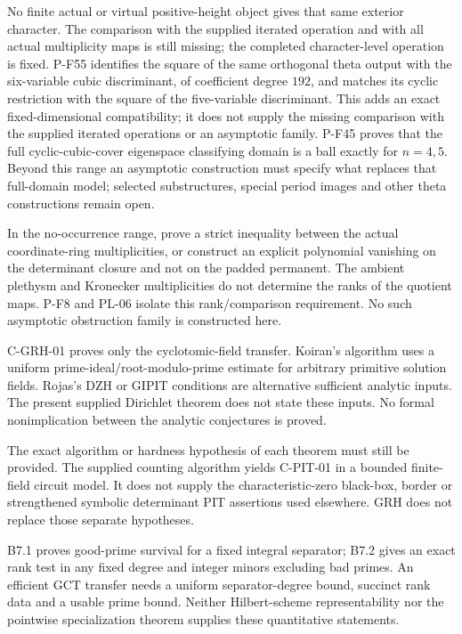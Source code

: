 \documentclass[11pt,a4paper]{article}
\begin{document}
\begin{description}
No finite actual or virtual positive-height object gives that
same exterior character. The comparison with the supplied
iterated operation and with all actual multiplicity maps is
still missing; the completed character-level operation is fixed.
P-F55 identifies the square of the same orthogonal theta output
with the six-variable cubic discriminant, of coefficient degree
$192$, and matches its cyclic restriction with the square of
the five-variable discriminant. This adds an exact fixed-dimensional
compatibility; it does not supply the missing comparison with
the supplied iterated operations or an asymptotic family.
P-F45 proves that the full cyclic-cubic-cover eigenspace
classifying domain is a ball exactly for $n=4,5$. Beyond
this range an asymptotic construction must specify what
replaces that full-domain model; selected substructures,
special period images and other theta constructions remain open.

\item[O-OBSTRUCTION: an actual family of separating equations.]
In the no-occurrence range, prove a strict inequality between the actual
coordinate-ring multiplicities, or construct an explicit polynomial
vanishing on the determinant closure and not on the padded permanent.
The ambient plethysm and Kronecker multiplicities do not determine the
ranks of the quotient maps. P-F8 and PL-06 isolate this rank/comparison
requirement. No such asymptotic obstruction family is constructed here.

\item[O-DIR-HN: arbitrary solution fields in Nullstellensatz.]
C-GRH-01 proves only the cyclotomic-field transfer. Koiran's algorithm uses
a uniform prime-ideal/root-modulo-prime estimate for arbitrary primitive
solution fields. Rojas's DZH or GIPIT conditions are alternative sufficient
analytic inputs. The present supplied Dirichlet theorem does not state
these inputs. No formal nonimplication between the analytic conjectures
is proved.

\item[O-PIT: the derandomization required by GCT V.]
The exact algorithm or hardness hypothesis of each theorem must still be
provided. The supplied counting algorithm yields C-PIT-01 in a bounded
finite-field circuit model. It does not supply the characteristic-zero
black-box, border or strengthened symbolic determinant PIT assertions
used elsewhere. GRH does not replace those separate hypotheses.

\item[O-INTEGRAL: uniform bounds for specialization.]
B7.1 proves good-prime survival for a fixed integral separator; B7.2 gives
an exact rank test in any fixed degree and integer minors excluding bad
primes. An efficient GCT transfer needs a uniform separator-degree bound,
succinct rank data and a usable prime bound. Neither Hilbert-scheme
representability nor the pointwise specialization theorem supplies these
quantitative statements.


\end{description}
\end{document}
